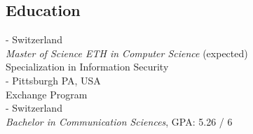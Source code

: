 \documentclass[mm, 11pt]{simple_style}
\begin{document}
\begin{resume}
\section{Education}
 - Switzerland \\
{\sl Master of Science ETH in Computer Science} (expected)\\
Specialization in Information Security\\
 - Pittsburgh PA, USA \\
Exchange Program\\
 - Switzerland  \\
{\sl Bachelor in Communication Sciences}, GPA: 5.26 / 6\\
\sectionline

\end{resume}
\end{document}
